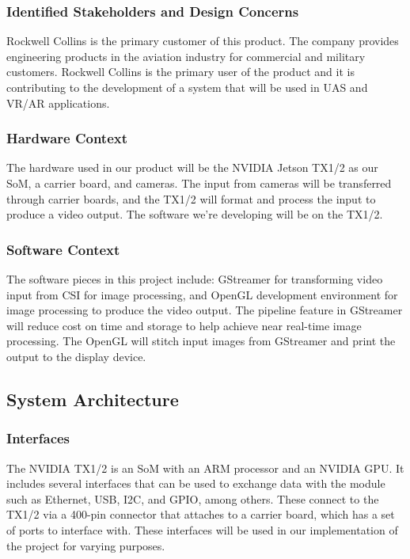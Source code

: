 \documentclass[letterpaper,10pt,serif,draftclsnofoot,onecolumn,compsoc,titlepage]{IEEEtran}
\begin{document}
\subsubsection{Identified Stakeholders and Design Concerns}

Rockwell Collins is the primary customer of this product. The company provides 
engineering products in the aviation industry for commercial and military customers. 
Rockwell Collins is the primary user of the product and it is contributing 
to the development of a system that will be used in UAS and VR/AR applications. \\

\subsubsection{Hardware Context}

The hardware used in our product will be the NVIDIA Jetson TX1/2 as our SoM, 
a carrier board, and cameras. The input from cameras will be transferred through 
carrier boards, and the TX1/2 will format and process the input to produce a 
video output. The software we're developing will be on the TX1/2. \\

\subsubsection{Software Context}

The software pieces in this project include: GStreamer for transforming video input 
from CSI for image processing, and OpenGL development environment for image processing 
to produce the video output. The pipeline feature in GStreamer will reduce 
cost on time and storage to help achieve near real-time image processing. The OpenGL 
will stitch input images from GStreamer and print the output to the display device. \\

\subsection{System Architecture}

\subsubsection{Interfaces}

The NVIDIA TX1/2 is an SoM with an ARM processor and an NVIDIA GPU. It includes several 
interfaces that can be used to exchange data with the module such as Ethernet, USB, 
I2C, and GPIO, among others. These connect to the TX1/2 via a 400-pin connector that 
attaches to a carrier board, which has a set of ports to interface with. These 
interfaces will be used in our implementation of the project for varying purposes. \\
\end{document}
